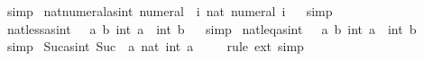 \begin{isabellebody}
\isamarkupfalse%
\ simp%
\endisatagproof
{\isafoldproof}%
%
\isadelimproof
\isanewline
%
\endisadelimproof
\isanewline
{}\isamarkupfalse%
\ nat{\isacharunderscore}{\kern0pt}numeral{\isacharunderscore}{\kern0pt}as{\isacharunderscore}{\kern0pt}int{\isacharcolon}{\kern0pt}\ {\isachardoublequoteopen}numeral\ {\isacharequal}{\kern0pt}\ {\isacharparenleft}{\kern0pt}{\isasymlambda}i{\isachardot}{\kern0pt}\ nat\ {\isacharparenleft}{\kern0pt}numeral\ i{\isacharparenright}{\kern0pt}{\isacharparenright}{\kern0pt}{\isachardoublequoteclose}%
\isadelimproof
\ %
\endisadelimproof
%
\isatagproof
{}\isamarkupfalse%
\ simp%
\endisatagproof
{\isafoldproof}%
%
\isadelimproof
%
\endisadelimproof
\isanewline
{}\isamarkupfalse%
\ nat{\isacharunderscore}{\kern0pt}less{\isacharunderscore}{\kern0pt}as{\isacharunderscore}{\kern0pt}int{\isacharcolon}{\kern0pt}\ {\isachardoublequoteopen}{\isacharparenleft}{\kern0pt}{\isacharless}{\kern0pt}{\isacharparenright}{\kern0pt}\ {\isacharequal}{\kern0pt}\ {\isacharparenleft}{\kern0pt}{\isasymlambda}a\ b{\isachardot}{\kern0pt}\ int\ a\ {\isacharless}{\kern0pt}\ int\ b{\isacharparenright}{\kern0pt}{\isachardoublequoteclose}%
\isadelimproof
\ %
\endisadelimproof
%
\isatagproof
{}\isamarkupfalse%
\ simp%
\endisatagproof
{\isafoldproof}%
%
\isadelimproof
%
\endisadelimproof
\isanewline
{}\isamarkupfalse%
\ nat{\isacharunderscore}{\kern0pt}leq{\isacharunderscore}{\kern0pt}as{\isacharunderscore}{\kern0pt}int{\isacharcolon}{\kern0pt}\ {\isachardoublequoteopen}{\isacharparenleft}{\kern0pt}{\isasymle}{\isacharparenright}{\kern0pt}\ {\isacharequal}{\kern0pt}\ {\isacharparenleft}{\kern0pt}{\isasymlambda}a\ b{\isachardot}{\kern0pt}\ int\ a\ {\isasymle}\ int\ b{\isacharparenright}{\kern0pt}{\isachardoublequoteclose}%
\isadelimproof
\ %
\endisadelimproof
%
\isatagproof
{}\isamarkupfalse%
\ simp%
\endisatagproof
{\isafoldproof}%
%
\isadelimproof
%
\endisadelimproof
\isanewline
{}\isamarkupfalse%
\ Suc{\isacharunderscore}{\kern0pt}as{\isacharunderscore}{\kern0pt}int{\isacharcolon}{\kern0pt}\ {\isachardoublequoteopen}Suc\ {\isacharequal}{\kern0pt}\ {\isacharparenleft}{\kern0pt}{\isasymlambda}a{\isachardot}{\kern0pt}\ nat\ {\isacharparenleft}{\kern0pt}int\ a\ {\isacharplus}{\kern0pt}\ {}{\isacharparenright}{\kern0pt}{\isacharparenright}{\kern0pt}{\isachardoublequoteclose}%
\isadelimproof
\ %
\endisadelimproof
%
\isatagproof
{}\isamarkupfalse%
\ {\isacharparenleft}{\kern0pt}rule\ ext{\isacharparenright}{\kern0pt}\ simp%

\end{isabellebody}
